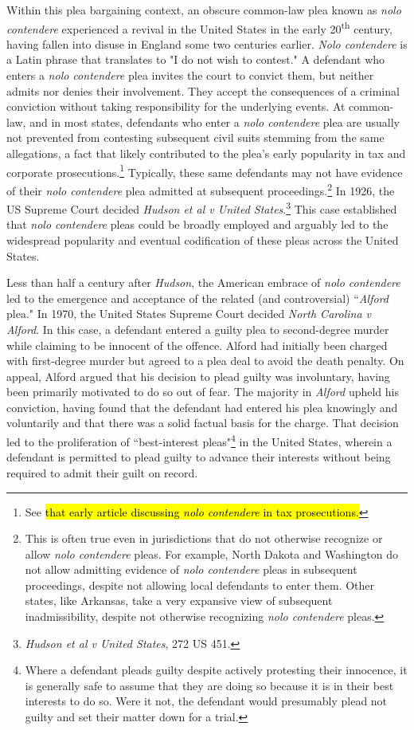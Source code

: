 Within this plea bargaining context, an obscure common-law plea known as \textit{nolo contendere} experienced a revival in the United States in the early 20\textsuperscript{th} century, having fallen into disuse in England some two centuries earlier. \textit{Nolo contendere} is a Latin phrase that translates to "I do not wish to contest." A defendant who enters a \textit{nolo contendere} plea invites the court to convict them, but neither admits nor denies their involvement. They accept the consequences of a criminal conviction without taking responsibility for the underlying events. At common-law, and in most states, defendants who enter a \textit{nolo contendere} plea are usually not prevented from contesting subsequent civil suits stemming from the same allegations, a fact that likely contributed to the plea's early popularity in tax and corporate prosecutions.\footnote{See \hl{that early article discussing \textit{nolo contendere} in tax prosecutions.}} Typically, these same defendants may not have evidence of their \textit{nolo contendere} plea admitted at subsequent proceedings.\footnote{This is often true even in jurisdictions that do not otherwise recognize or allow \textit{nolo contendere} pleas. For example, North Dakota and Washington do not allow admitting evidence of \textit{nolo contendere} pleas in subsequent proceedings, despite not allowing local defendants to enter them. Other states, like Arkansas, take a very expansive view of subsequent inadmissibility, despite not otherwise recognizing \textit{nolo contendere} pleas.} In 1926, the US Supreme Court decided \textit{Hudson et al v United States}.\footnote{\textit{Hudson et al v United States}, 272 US 451.} This case established that \textit{nolo contendere} pleas could be broadly employed and arguably led to the widespread popularity and eventual codification of these pleas across the United States.

Less than half a century after \textit{Hudson}, the American embrace of \textit{nolo contendere} led to the emergence and acceptance of the related (and controversial) ``\textit{Alford} plea." In 1970, the United States Supreme Court decided \textit{North Carolina v Alford}. In this case, a defendant entered a guilty plea to second-degree murder while claiming to be innocent of the offence. Alford had initially been charged with first-degree murder but agreed to a plea deal to avoid the death penalty. On appeal, Alford argued that his decision to plead guilty was involuntary, having been primarily motivated to do so out of fear. The majority in \textit{Alford} upheld his conviction, having found that the defendant had entered his plea knowingly and voluntarily and that there was a solid factual basis for the charge. That decision led to the proliferation of ``best-interest pleas"\footnote{Where a defendant pleads guilty despite actively protesting their innocence, it is generally safe to assume that they are doing so because it is in their best interests to do so. Were it not, the defendant would presumably plead not guilty and set their matter down for a trial.} in the United States, wherein a defendant is permitted to plead guilty to advance their interests without being required to admit their guilt on record. 

